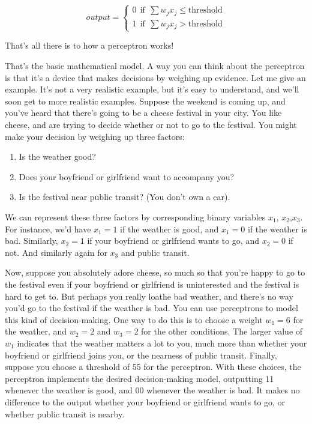 \documentclass[a4paper,12pt]{report}%
\begin{document}
\begin{center}
 \begin{equation}
  output    =   \begin{cases}
                0 ~~ \text{if} ~~ \sum w_{j} x_{j} \le \text{threshold} \\
                1 ~~ \text{if} ~~ \sum w_{j} x_{j}  >  \text{threshold}
                \end{cases}
 \end{equation}
\end{center}

That's all there is to how a perceptron works!

That's the basic mathematical model. A way you can think about the perceptron is that it's a device that makes decisions by weighing up evidence. Let me give an example. It's not a very realistic example, but it's easy to understand, and we'll soon get to more realistic examples. Suppose the weekend is coming up, and you've heard that there's going to be a cheese festival in your city. You like cheese, and are trying to decide whether or not to go to the festival. You might make your decision by weighing up three factors:

\begin{enumerate}
 \item Is the weather good?
 \item Does your boyfriend or girlfriend want to accompany you?
 \item Is the festival near public transit? (You don't own a car).
\end{enumerate}

We can represent these three factors by corresponding binary variables $x_{1}$, $x_{2}$,$ x_{3}$. For instance, we'd have $x_{1} = 1$ if the weather is good, and $x_{1} = 0$ if the weather is bad. Similarly, $x_{2} = 1$ if your boyfriend or girlfriend wants to go, and $x_{2} = 0$ if not. And similarly again for $x_{3}$ and public transit.

Now, suppose you absolutely adore cheese, so much so that you're happy to go to the festival even if your boyfriend or girlfriend is uninterested and the festival is hard to get to. But perhaps you really loathe bad weather, and there's no way you'd go to the festival if the weather is bad. You can use perceptrons to model this kind of decision-making. One way to do this is to choose a weight $w_{1} = 6$ for the weather, and $w_{2} = 2$ and $w_{3} = 2$ for the other conditions. The larger value of $w_{1}$ indicates that the weather matters a lot to you, much more than whether your boyfriend or girlfriend joins you, or the nearness of public transit. Finally, suppose you choose a threshold of 55 for the perceptron. With these choices, the perceptron implements the desired decision-making model, outputting 11 whenever the weather is good, and 00 whenever the weather is bad. It makes no difference to the output whether your boyfriend or girlfriend wants to go, or whether public transit is nearby.
\end{document}
